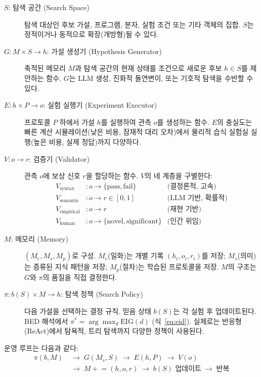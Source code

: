 \documentclass[11pt]{article}
\begin{document}
\begin{description}
  \item[$S$: 탐색 공간 (Search Space)] 탐색 대상인 후보 가설, 프로그램, 분자, 실험 조건 또는 기타 객체의 집합. $S$는 정적이거나 동적으로 확장(개방형)될 수 있다.

  \item[$G: M \times S \rightarrow h$: 가설 생성기 (Hypothesis Generator)] 축적된 메모리 $M$과 탐색 공간의 현재 상태를 조건으로 새로운 후보 $h \in S$를 제안하는 함수. $G$는 LLM 생성, 진화적 돌연변이, 또는 기호적 탐색을 수반할 수 있다.

  \item[$E: h \times P \rightarrow o$: 실험 실행기 (Experiment Executor)] 프로토콜 $P$ 하에서 가설 $h$를 실행하여 관측 $o$를 생성하는 함수. $E$의 충실도는 빠른 계산 시뮬레이션(낮은 비용, 잠재적 대리 오차)에서 물리적 습식 실험실 실행(높은 비용, 실제 정답)까지 다양하다.

  \item[$V: o \rightarrow r$: 검증기 (Validator)] 관측 $o$에 보상 신호 $r$을 할당하는 함수. $V$의 네 계층을 구별한다:
    \begin{align*}
      V_\text{syntax}   &: o \rightarrow \{\text{pass}, \text{fail}\} & \text{(결정론적, 고속)}\\
      V_\text{semantic} &: o \rightarrow r \in [0,1]                  & \text{(LLM 기반, 확률적)}\\
      V_\text{empirical}&: o \rightarrow r                            & \text{(재현 기반)}\\
      V_\text{human}    &: o \rightarrow \{\text{novel}, \text{significant}\} & \text{(인간 위임)}
    \end{align*}

  \item[$M$: 메모리 (Memory)] $(M_e, M_s, M_p)$로 구성. $M_e$(일화)는 개별 기록 $(h_i, o_i, r_i)$를 저장; $M_s$(의미)는 증류된 지식 패턴을 저장; $M_p$(절차)는 학습된 프로토콜을 저장. $M$의 구조는 $G$와 $\pi$의 품질을 직접 결정한다.

  \item[$\pi: b(S) \times M \rightarrow h$: 탐색 정책 (Search Policy)] 다음 가설을 선택하는 결정 규칙. 믿음 상태 $b(S)$는 각 실험 후 업데이트된다. BED 해석에서 $\pi^* = \arg\max_d \mathrm{EIG}(d)$ (식~\ref{eq:eid}). 실제로는 반응형(ReAct)에서 탐욕적, 트리 탐색까지 다양한 정책이 사용된다.
\end{description}

\noindent 운영 루프는 다음과 같다:
\begin{align}
  \pi(b, M) &\;\rightarrow\; G(M_s, S) \;\rightarrow\; E(h, P) \;\rightarrow\; V(o) \nonumber\\
            &\;\rightarrow\; M \mathrel{+}= (h, o, r) \;\rightarrow\; b(S) \text{ 업데이트} \;\rightarrow\; \text{반복}
\end{align}
\end{document}
